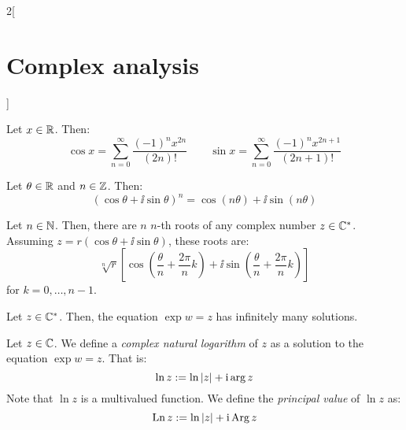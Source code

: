 \documentclass[../../../main_math.tex]{subfiles}
\begin{document}
\begin{multicols}{2}[\section{Complex analysis}]
\begin{corollary}
  \end{corollary}
  \begin{corollary}
    Let $x\in\mathbb{R}$. Then: $$\cos x=\sum_{n=0}^\infty\frac{(-1)^nx^{2n}}{(2n)!}\qquad\sin x=\sum_{n=0}^\infty\frac{(-1)^nx^{2n+1}}{(2n+1)!}$$
  \end{corollary}
  \begin{proposition}
    Let $\theta\in\mathbb{R}$ and $n\in\mathbb{Z}$. Then: $${(\cos{\theta} + \ii\sin{\theta})}^n = \cos(n\theta) + \ii\sin(n\theta)$$
  \end{proposition}
  \begin{theorem}
    Let $n\in\mathbb{N}$. Then, there are $n$ $n$-th roots of any complex number $z\in \mathbb{C}^*$. Assuming $z=r(\cos\theta + \ii\sin\theta)$, these roots are: $$\sqrt[n]{r}\left[\cos\left(\frac{\theta}{n}+\frac{2\pi}{n}k\right)+\ii\sin\left(\frac{\theta}{n}+\frac{2\pi}{n}k\right)\right]$$ for $k=0,\ldots,n-1$.
  \end{theorem}
  \begin{proposition}
    Let $z\in\mathbb{C}^*$. Then, the equation $\exp{w}=z$ has infinitely many solutions.
  \end{proposition}
  \begin{definition}
    Let $z\in \mathbb{C}$. We define a \emph{complex natural logarithm} of $z$ as a solution to the equation $\exp{w}=z$. That is: $$\ln z:=\ln \abs{z}+\mathrm{i}\arg z$$ Note that $\ln z$ is a multivalued function.
    We define the \emph{principal value} of $\ln z$ as: $$\operatorname{Ln} z:=\ln \abs{z}+\mathrm{i}\operatorname{Arg} z$$
  \end{definition}

\end{multicols}
\end{document}
